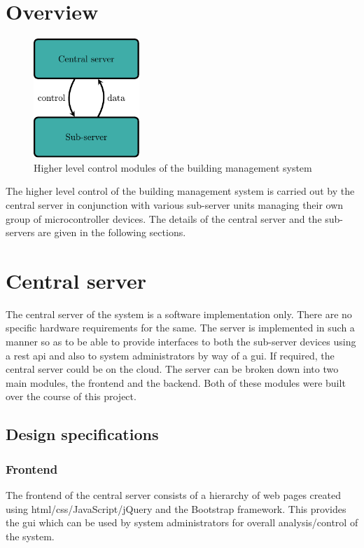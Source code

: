 \documentclass[letterpaper,11pt]{report}
\begin{document}
\section{Overview}
\begin{figure}[h]
\includegraphics[width=4cm, height=4.5cm]{des}
\centering
\captionsetup{justification=centering}
\caption{Higher level control modules of the building management system}
\label{fig:des}
\end{figure}
The higher level control of the building management system is carried out by the central server in conjunction with various sub-server units managing their own group of microcontroller devices. The details of the central server and the sub-servers are given in the following sections.
\section{Central server}
The central server of the system is a software implementation only. There are no specific hardware requirements for the same. The server is implemented in such a manner so as to be able to provide interfaces to both the sub-server devices using a \ac{rest} \ac{api} and also to system administrators by way of a \ac{gui}. If required, the central server could be on the cloud. The server can be broken down into two main modules, the frontend and the backend. Both of these modules were built over the course of this project.
\subsection{Design specifications}
\subsubsection{Frontend}
The frontend of the central server consists of a hierarchy of web pages created using \ac{html}/\newline \ac{css}/JavaScript/jQuery and the Bootstrap framework. This provides the \ac{gui} which can be used by system administrators for overall analysis/control of the system.
\end{document}
